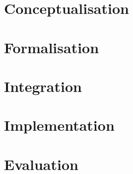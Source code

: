 




\chapter{Conceptualisation}\label{ch:Conceptualisation}
\chapter{Formalisation}\label{ch:Formalisation}
\chapter{Integration}\label{ch:Integration}
\chapter{Implementation}\label{ch:Implementation}
\chapter{Evaluation}\label{ch:Evaluation}